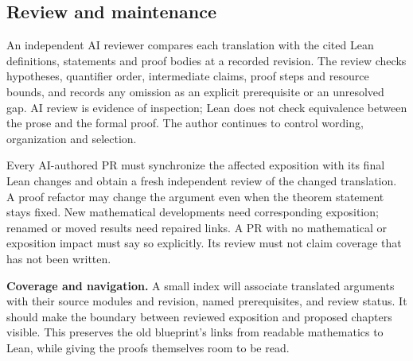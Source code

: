 \subsection*{Review and maintenance}
An independent AI reviewer compares each translation with the cited Lean definitions,
statements and proof bodies at a recorded revision. The review checks hypotheses,
quantifier order, intermediate claims, proof steps and resource bounds, and records any
omission as an explicit prerequisite or an unresolved gap. AI review is evidence of
inspection; Lean does not check equivalence between the prose and the formal proof.
The author continues to control wording, organization and selection.

Every AI-authored PR must synchronize the affected exposition with its final Lean
changes and obtain a fresh independent review of the changed translation. A proof
refactor may change the argument even when the theorem statement stays fixed.
New mathematical developments need corresponding exposition; renamed or moved
results need repaired links. A PR with no mathematical or exposition impact must say
so explicitly. Its review must not claim coverage that has not been written.

\textbf{Coverage and navigation.}
A small index will associate translated arguments with their source modules and
revision, named prerequisites, and review status. It should make the boundary between
reviewed exposition and proposed chapters visible. This preserves the old blueprint's
links from readable mathematics to Lean, while giving the proofs themselves room to be read.
